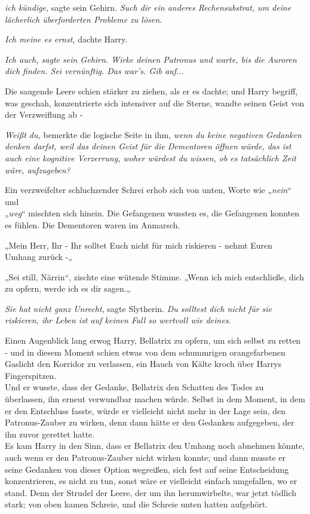 {\emph{ich kündige,} sagte sein Gehirn. \emph{Such dir ein anderes Rechensubstrat, um deine lächerlich überforderten Probleme zu lösen.}

\emph{Ich meine es ernst,} dachte Harry.

\emph{Ich auch, sagte sein Gehirn. Wirke deinen Patronus und warte, bis die Auroren dich finden. Sei vernünftig. Das war's. Gib auf...}

Die saugende Leere schien stärker zu ziehen, als er es dachte; und Harry begriff, was geschah, konzentrierte sich intensiver auf die Sterne, wandte seinen Geist von der Verzweiflung ab -

\emph{Weißt du,} bemerkte die logische Seite in ihm, \emph{wenn du keine negativen Gedanken denken darfst, weil das deinen Geist für die Dementoren öffnen würde, das ist auch eine kognitive Verzerrung, woher würdest du wissen, ob es tatsächlich Zeit wäre, aufzugeben?}

Ein verzweifelter schluchzender Schrei erhob sich von unten, Worte wie „\emph{nein}“ und\\ „\emph{weg}“ mischten sich hinein. Die Gefangenen wussten es, die Gefangenen konnten es fühlen. Die Dementoren waren im Anmarsch.

„Mein Herr, Ihr - Ihr solltet Euch nicht für mich riskieren - nehmt Euren Umhang zurück -„

„Sei still, Närrin“, zischte eine wütende Stimme. „Wenn ich mich entschließe, dich zu opfern, werde ich es dir sagen.„

\emph{Sie hat nicht ganz Unrecht,} sagte Slytherin. \emph{Du solltest dich nicht für sie riskieren, ihr Leben ist auf keinen Fall so wertvoll wie deines}.

Einen Augenblick lang erwog Harry, Bellatrix zu opfern, um sich selbst zu retten - und in diesem Moment schien etwas von dem schummrigen orangefarbenen Gaslicht den Korridor zu verlassen, ein Hauch von Kälte kroch über Harrys Fingerspitzen.\\ Und er wusste, dass der Gedanke, Bellatrix den Schatten des Todes zu überlassen, ihn erneut verwundbar machen würde. Selbst in dem Moment, in dem er den Entschluss fasste, würde er vielleicht nicht mehr in der Lage sein, den Patronus-Zauber zu wirken, denn dann hätte er den Gedanken aufgegeben, der ihn zuvor gerettet hatte.\\ Es kam Harry in den Sinn, dass er Bellatrix den Umhang noch abnehmen könnte, auch wenn er den Patronus-Zauber nicht wirken konnte; und dann musste er seine Gedanken von dieser Option wegreißen, sich fest auf seine Entscheidung konzentrieren, es nicht zu tun, sonst wäre er vielleicht einfach umgefallen, wo er stand. Denn der Strudel der Leere, der um ihn herumwirbelte, war jetzt tödlich stark; von oben kamen Schreie, und die Schreie unten hatten aufgehört.

}

